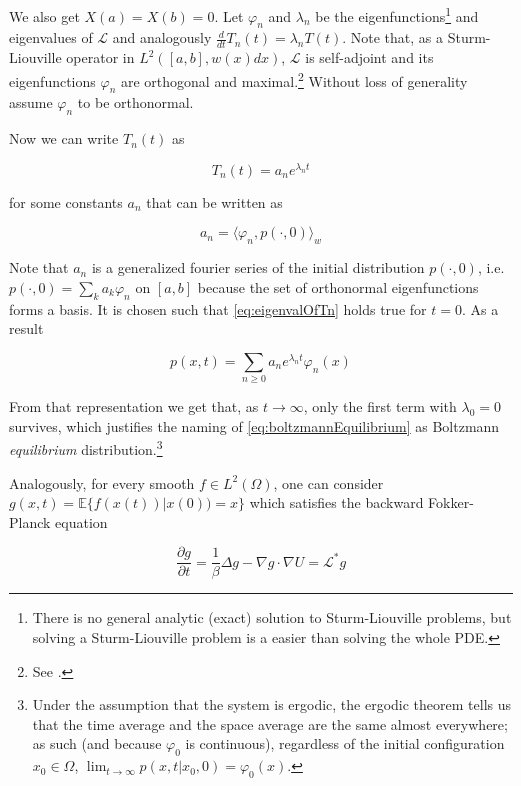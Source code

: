 We also get $X(a)=X(b)=0$. Let $\varphi_n$ and $\lambda_n$ be the eigenfunctions\footnote{There is no general analytic (exact) solution to Sturm-Liouville problems, but solving a Sturm-Liouville problem is a easier than solving the whole PDE.} and eigenvalues of $\mathcal{L}$ and analogously $\frac{d}{dt}T_n(t)=\lambda_n T(t)$. Note that, as a Sturm-Liouville operator in $L^2([a,b], w(x)dx)$, $\mathcal{L}$ is self-adjoint and its eigenfunctions $\varphi_n$ are orthogonal and maximal.\footnote{See \cite{Teschl2012}.} Without loss of generality assume $\varphi_n$ to be orthonormal.

Now we can write $T_n(t)$ as

\begin{equation}\label{eq:eigenvalOfTn}
T_n(t) = a_n e^{\lambda_n t}
\end{equation}

for some constants $a_n$ that can be written as

\begin{equation*}
a_n = \langle \varphi_n, p(\cdot, 0) \rangle_w
\end{equation*}

Note that $a_n$ is a generalized fourier series of the initial distribution $p(\cdot, 0)$, i.e. $p(\cdot, 0) = \sum_k a_k \varphi_n$ on $[a,b]$ because the set of orthonormal eigenfunctions forms a basis. It is chosen such that \eqref{eq:eigenvalOfTn} holds true for $t=0$. As a result

\begin{equation}\label{eq:decompositionProbDistributionfFPO}
p(x,t) = \sum_{n\geq 0} a_n e^{\lambda_n t} \varphi_n(x)
\end{equation}

From that representation we get that, as $t\rightarrow \infty$, only the first term with $\lambda_0 = 0$ survives, which justifies the naming of \eqref{eq:boltzmannEquilibrium} as Boltzmann \textit{equilibrium} distribution.\footnote{Under the assumption that the system is ergodic, the ergodic theorem tells us that the time average and the space average are the same almost everywhere; as such (and because $\varphi_0$ is continuous), regardless of the initial configuration $x_0\in\Omega$, $\lim_{t\rightarrow\infty} p(x,t | x_0, 0) = \varphi_0(x)$.}

Analogously, for every smooth $f\in L^2(\Omega)$, one can consider $g(x,t) = \mathbb{E}\{f(x(t)) | x(0) ) = x \}$ which satisfies the backward Fokker-Planck equation

\begin{equation*}
\frac{\partial g}{\partial t} = \frac{1}{\beta}\Delta g - \nabla g \cdot\nabla U = \mathcal{L}^*g
\end{equation*}


